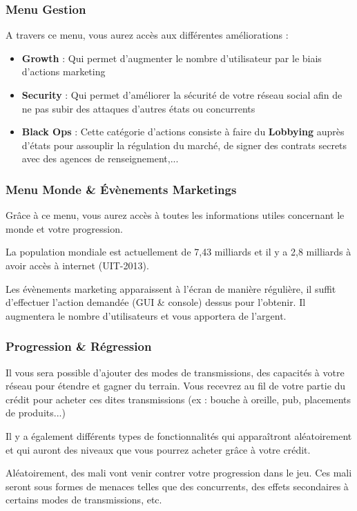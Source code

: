 \subsubsection{Menu Gestion}
A travers ce menu, vous aurez accès aux différentes améliorations :
\begin{itemize}
            \item \textbf{Growth} : Qui permet d'augmenter le nombre d'utilisateur par le biais d'actions marketing
            \item \textbf{Security} : Qui permet d'améliorer la sécurité de votre réseau social afin de ne pas subir des attaques d'autres états ou concurrents
            \item \textbf{Black Ops} : Cette catégorie d'actions consiste à faire du \textbf{Lobbying} auprès d'états pour assouplir la régulation du marché, de signer des contrats secrets avec des agences de renseignement,...
        \end{itemize}

\subsubsection{Menu Monde \& Évènements Marketings}
Grâce à ce menu, vous aurez accès à toutes les informations utiles concernant le monde et votre progression. 

La population mondiale est actuellement de 7,43 milliards et il y a 2,8 milliards à avoir accès à internet (UIT-2013).

Les évènements marketing apparaissent à l'écran de manière régulière, il suffit d'effectuer l'action demandée (GUI \& console) dessus pour l'obtenir. Il augmentera le nombre d'utilisateurs et vous apportera de l'argent.

\subsubsection{Progression \& Régression}

Il vous sera possible d'ajouter des modes de transmissions, des capacités à votre réseau pour étendre et gagner du terrain. Vous recevrez au fil de votre partie du crédit pour acheter ces dites transmissions (ex : bouche à oreille, pub, placements de produits...)

Il y a également différents types de fonctionnalités qui apparaîtront aléatoirement et qui auront des niveaux que vous pourrez acheter grâce à votre crédit.

Aléatoirement, des mali vont venir contrer votre progression dans le jeu. Ces mali seront sous formes de menaces telles que des concurrents, des effets secondaires à certains modes de transmissions, etc. 

